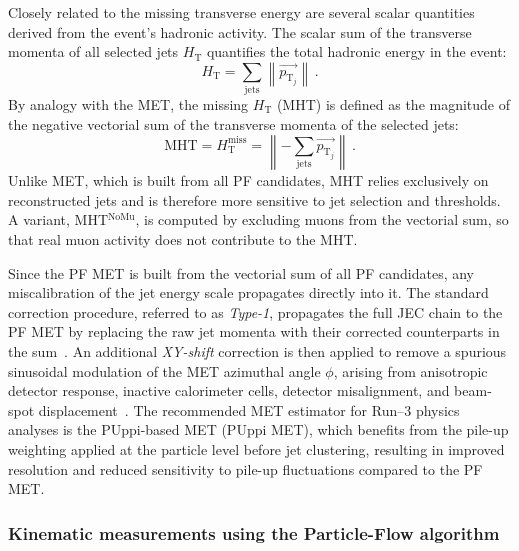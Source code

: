 Closely related to the missing transverse energy are several scalar quantities derived from the event's hadronic activity. The scalar sum of the transverse momenta of all selected jets $H_{\mathrm{T}}$ quantifies the total hadronic energy in the event:
\begin{equation}
    H_{\mathrm{T}} = \sum_{\mathrm{jets}} \left\|\overrightarrow{p_{\mathrm{T}_j}}\right\| \, .
    \label{eq:ht}
\end{equation}
By analogy with the MET, the missing $H_{\mathrm{T}}$ (MHT) is defined as the magnitude of the negative vectorial sum of the transverse momenta of the selected jets:
\begin{equation}
    \mathrm{MHT} = H_{\mathrm{T}}^\mathrm{miss} = \left\| -\sum_{\mathrm{jets}} \overrightarrow{p_{\mathrm{T}_j}} \right\| \, .
    \label{eq:mht}
\end{equation}
Unlike MET, which is built from all PF candidates, MHT relies exclusively on reconstructed jets and is therefore more sensitive to jet selection and thresholds. A variant, MHT$^\mathrm{NoMu}$, is computed by excluding muons from the vectorial sum, so that real muon activity does not contribute to the MHT.

\vspace{0.5 cm}

Since the PF MET is built from the vectorial sum of all PF candidates, any miscalibration of the jet energy scale propagates directly into it. The standard correction procedure, referred to as \textit{Type-1}, propagates the full JEC chain to the PF MET by replacing the raw jet momenta with their corrected counterparts in the sum~\cite{METcalib}. An additional \textit{XY-shift} correction is then applied to remove a spurious sinusoidal modulation of the MET azimuthal angle $\phi$, arising from anisotropic detector response, inactive calorimeter cells, detector misalignment, and beam-spot displacement~\cite{METcalib}. The recommended MET estimator for Run--3 physics analyses is the PUppi-based MET (PUppi MET), which benefits from the pile-up weighting applied at the particle level before jet clustering, resulting in improved resolution and reduced sensitivity to pile-up fluctuations compared to the PF MET.



\subsubsection{Kinematic measurements using the Particle-Flow algorithm}
\label{sec:PFvsTrack}

